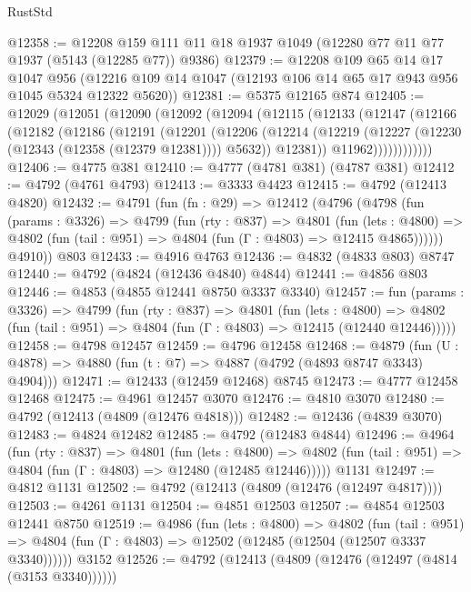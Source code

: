 \begin{lexlean}{RustStd}
\begin{coremodule}
@12358 := @12208 @159 @111 @11 @18 @1937 @1049 (@12280 @77 @11 @77 @1937 (@5143 (@12285 @77)) @9386)
@12379 := @12208
    @109
    @65
    @14
    @17
    @1047
    @956
    (@12216 @109 @14 @1047 (@12193 @106 @14 @65 @17 @943 @956 @1045 @5324 @12322 @5620))
@12381 := @5375 @12165 @874
@12405 := @12029
    (@12051
      (@12090
        (@12092
          (@12094
            (@12115
              (@12133
                (@12147
                  (@12166
                    (@12182
                      (@12186
                        (@12191
                          (@12201
                            (@12206
                              (@12214
                                (@12219 (@12227 (@12230 (@12343 (@12358 (@12379 @12381)))) @5632))
                                @12381))
                            @11962))))))))))))
@12406 := @4775 @381
@12410 := @4777 (@4781 @381) (@4787 @381)
@12412 := @4792 (@4761 @4793)
@12413 := @3333 @4423
@12415 := @4792 (@12413 @4820)
@12432 := @4791
    (fun (fn : @29) =>
    @12412
      (@4796
        (@4798
          (fun (params : @3326) =>
          @4799
            (fun (rty : @837) =>
            @4801
              (fun (lets : @4800) =>
              @4802 (fun (tail : @951) => @4804 (fun (Γ : @4803) => @12415 @4865))))))
        @4910))
    @803
@12433 := @4916 @4763
@12436 := @4832 (@4833 @803) @8747
@12440 := @4792 (@4824 (@12436 @4840) @4844)
@12441 := @4856 @803
@12446 := @4853 (@4855 @12441 @8750 @3337 @3340)
@12457 := fun (params : @3326) =>
  @4799
    (fun (rty : @837) =>
    @4801
      (fun (lets : @4800) =>
      @4802 (fun (tail : @951) => @4804 (fun (Γ : @4803) => @12415 (@12440 @12446)))))
@12458 := @4798 @12457
@12459 := @4796 @12458
@12468 := @4879 (fun (U : @4878) => @4880 (fun (t : @7) => @4887 (@4792 (@4893 @8747 @3343) @4904)))
@12471 := @12433 (@12459 @12468) @8745
@12473 := @4777 @12458 @12468
@12475 := @4961 @12457 @3070
@12476 := @4810 @3070
@12480 := @4792 (@12413 (@4809 (@12476 @4818)))
@12482 := @12436 (@4839 @3070)
@12483 := @4824 @12482
@12485 := @4792 (@12483 @4844)
@12496 := @4964
    (fun (rty : @837) =>
    @4801
      (fun (lets : @4800) =>
      @4802 (fun (tail : @951) => @4804 (fun (Γ : @4803) => @12480 (@12485 @12446)))))
    @1131
@12497 := @4812 @1131
@12502 := @4792 (@12413 (@4809 (@12476 (@12497 @4817))))
@12503 := @4261 @1131
@12504 := @4851 @12503
@12507 := @4854 @12503 @12441 @8750
@12519 := @4986
    (fun (lets : @4800) =>
    @4802
      (fun (tail : @951) =>
      @4804 (fun (Γ : @4803) => @12502 (@12485 (@12504 (@12507 @3337 @3340))))))
    @3152
@12526 := @4792 (@12413 (@4809 (@12476 (@12497 (@4814 (@3153 @3340))))))

\end{coremodule}
\end{lexlean}

